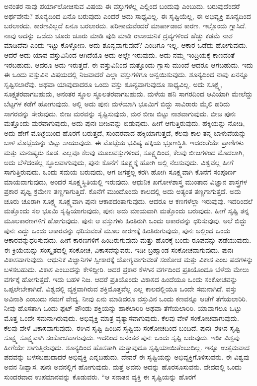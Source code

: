 ಅನಂತರ ನಾವು ಪರ್ಯಾಲೋಚಿಸುವ ವಿಷಯ ಈ ವಸ್ತುಗಳೆಲ್ಲ ಎಲ್ಲಿಂದ ಬಂದುವು ಎಂಬುದು. ಬರುವುದೆಂದರೆ ಅರ್ಥವೇನು? ಶೂನ್ಯದಿಂದ ಏನೊ ಬರುವುದು ಎಂದರೆ ಅದು ಸಾಧ್ಯವಿಲ್ಲ. ಈ ಸೃಷ್ಟಿಯೆಲ್ಲ, ಈ ಅಭಿವ್ಯಕ್ತಿ ಶೂನ್ಯದಿಂದ ಬರಲಾರದು. ಕಾರಣವಿಲ್ಲದೆ ಏನೂ ಬರಲಾರದು. ಪರಿಣಾಮವೆಂದರೆ ಮಾರ್ಪಾಡಾದ ಕಾರಣ. ಇಲ್ಲೊಂದು ಗ್ಲಾಸಿದೆ. ನಾವು ಅದನ್ನು ಒಡೆದು ಚೂರು ಚೂರು ಮಾಡಿ ಪುಡಿ ಮಾಡಿ ರಾಸಾಯನಿಕ ದ್ರವ್ಯಗಳಿಂದ ಹೆಚ್ಚು ಕಡಮೆ ನಾಶ ಮಾಡಿದೆವು ಎಂದು ಇಟ್ಟು ಕೊಳ್ಳೋಣ. ಅದು ಶೂನ್ಯವಾಗುವುದೆ? ಎಂದಿಗೂ ಇಲ್ಲ. ಆಕಾರ ಒಡೆದು ಹೋಗುವುದು. ಆದರೆ ಅದು ಯಾವ ವಸ್ತುವಿನಿಂದ ಆಗಿದೆಯೊ ಅದು ಅಲ್ಲೇ ಇರುವುದು. ಅದು ನಮ್ಮ ಇಂದ್ರಿಯಕ್ಕೆ ಕಾಣದಂತೆ ಇರಬಹುದು. ಆದರೂ ಅದು ಇರುತ್ತದೆ. ಈ ವಸ್ತುವಿನಿಂದ ಮತ್ತೊಂದು ಗ್ಲಾಸು ಮುಂದೆ ಆದರೂ ಆಗಬಹುದು. ಇದು ಈ ಒಂದು ವಸ್ತುವಿನ ವಿಷಯದಲ್ಲಿ ನಿಜವಾದರೆ ಎಲ್ಲಾ ವಸ್ತುಗಳಿಗೂ ಅನ್ವಯಿಸುವುದು. ಶೂನ್ಯದಿಂದ ನಾವು ಏನನ್ನೂ ಸೃಷ್ಟಿಸಲಾರೆವು. ಅಥವಾ ಯಾವುದಾದರೂ ಒಂದು ವಸ್ತು ಶೂನ್ಯವಾಗುವುದೂ ಸಾಧ್ಯವಿಲ್ಲ. ಅದು ಸೂಕ್ಷ್ಮ, ಸೂಕ್ಷ್ಮತರವಾಗಬಹುದು, ಅನಂತರ ಸ್ಥೂಲ ಸ್ಥೂಲತರವಾಗಬಹುದು. ಮಳೆಯ ಹನಿ ಸಾಗರದಿಂದ ಆವಿಯಾಗಿ ಮೇಲೆದ್ದು ಬೆಟ್ಟಗಳ ಕಡೆಗೆ ಹೋಗುವುದು. ಅಲ್ಲಿ ಅದು ಪುನಃ ಮಳೆಯಾಗಿ ಭೂಮಿಗೆ ಬಿದ್ದು ಸಾವಿರಾರು ಮೈಲಿ ಹರಿದು ಸಾಗರವನ್ನು ಸೇರುವುದು. ಬೀಜ ಮರವನ್ನು ಸೃಷ್ಟಿಸುವುದು, ಮರ ಬೀಜ ಬಿಟ್ಟು ನಾಶವಾಗುವುದು. ಬೀಜ ಪುನಃ ಮತ್ತೊಂದು ಮರವಾಗುವುದು, ಅದು ಪುನಃ ಬೀಜವನ್ನು ಬಿಡುವುದು. ಹೀಗೆ ಆಗುತ್ತಿರುವುದು. ಹಕ್ಕಿಯನ್ನು ನೋಡಿ, ಅದು ಹೇಗೆ ಮೊಟ್ಟೆಯಿಂದ ಹೊರಗೆ ಬರುತ್ತದೆ, ಸುಂದರವಾದ ಹಕ್ಕಿಯಾಗುತ್ತದೆ, ಕೆಲವು ಕಾಲ ತನ್ನ ಬಾಳುವೆಯನ್ನು ಬಾಳಿ ಮೊಟ್ಟೆಯನ್ನು ಬಿಟ್ಟು ಸಾಯುವುದು. ಈ ಮೊಟ್ಟೆಯ ಭವಿಷ್ಯ ಹಕ್ಕಿಯ ಭ್ರೂಣಸ್ಥಿತಿ. ಇದರಂತೆಯೇ ಪ್ರಾಣಿಗಳು ಮತ್ತು ಮನುಷ್ಯರು ಕೂಡ. ಎಲ್ಲವೂ ಕೆಲವು ಮೂಲವಸ್ತುಗಳಿಂದ, ಸೂಕ್ಷ್ಮದಿಂದ, ಕೆಲವು ಬೀಜಗಳಿಂದ ಮೊದಲಾಗಿ, ಅದು ಬೆಳೆದಂತೆಲ್ಲ ಸ್ಥೂಲವಾಗುವುದು, ಪುನಃ ಕೊನೆಗೆ ಸೂಕ್ಷ್ಮಕ್ಕೆ ಹೋಗಿ ಅಲ್ಲಿ ನೆಲಸುವುದು. ವಿಶ್ವವೆಲ್ಲ ಹೀಗೆ ಸಾಗುತ್ತಿರುವುದು. ಒಂದು ಸಮಯ ಬರುವುದು, ಆಗ ಜಗತ್ತೆಲ್ಲ ಕರಗಿ ಹೋಗಿ ಸೂಕ್ಷ್ಮವಾಗಿ ಕೊನೆಗೆ ಸಂಪೂರ್ಣ ಮಾಯವಾಗುವುದು, ಅಂದರೆ ಸೂಕ್ಷ್ಮಸ್ಥಿತಿಯಲ್ಲಿ ಇರುವುದು. ಆಧುನಿಕ ಖಗೋಳಶಾಸ್ತ್ರ ಮುಂತಾದ ವಿಜ್ಞಾನ ಶಾಸ್ತ್ರಗಳ ಪ್ರಕಾರ ಪೃಥ್ವಿ ಕ್ರಮೇಣ ತಣ್ಣಗಾಗುತ್ತಿದೆ. ಕೊನೆಗೆ ಮುಂದೊಂದು ಕಾಲದಲ್ಲಿ ಅದು ಅತ್ಯಂತ ತಣ್ಣಗಾಗುತ್ತದೆ. ಅದು ಚೂರು ಚೂರಾಗಿ ಸೂಕ್ಷ್ಮ ಸೂಕ್ಷ್ಮವಾಗಿ ಪುನಃ ಆಕಾಶದಂತಾಗುವುದು. ಆದರೂ ಆ ಕಣಗಳೆಲ್ಲಾ ಇರುವುವು. ಇದರಿಂದಲೆ ಮತ್ತೊಂದು ಸಲ ಭೂಮಿ ಸೃಷ್ಟಿಯಾಗುವುದು, ಪುನಃ ಅದು ಮಾಯವಾಗಿ ಮತ್ತೊಂದು ಬರುವುದು. ಹೀಗೆ ಸೃಷ್ಟಿ ತನ್ನ ಮೂಲಕಾರಣಗಳಿಗೆ ಹೋಗುವುದು. ಪುನಃ ಆ ವಸ್ತುಗಳು ಹಿಂತಿರುಗಿ ಒಂದು ಆಕಾರವನ್ನು ಧರಿಸುವುವು. ಅಲೆ ಬಿದ್ದು ಪುನಃ ಎದ್ದು ಒಂದು ಆಕಾರವನ್ನು ಧರಿಸುವಂತೆ ಮೂಲ ಕಾರಣಕ್ಕೆ ಹಿಂತಿರುಗುವುದು, ಪುನಃ ಅಲ್ಲಿಂದ ಒಂದು ಆಕಾರವನ್ನು\break ಧರಿಸುವುದು. ಹೀಗೆ ಕಾರಣಗಳಿಗೆ ಹಿಂದಿರುಗುವುದು ಮತ್ತು ಹೊರಕ್ಕೆ ಬಂದು ರೂಪವನ್ನು ಪಡೆಯುವುದು. ಈ ಕ್ರಿಯೆಯನ್ನು ಸಂಸ್ಕೃತದಲ್ಲಿ ಸಂಕೋಚ, ವಿಕಾಸವೆನ್ನುವರು. ಇಡೀ ಬ್ರಹ್ಮಾಂಡ ಸಂಕೋಚವಾಗುವುದು. ಪುನಃ ವಿಕಾಸವಾಗುವುದು. ಆಧುನಿಕ ವಿಜ್ಞಾನಿಗಳ ಸ್ವೀಕಾರಕ್ಕೆ ಯೋಗ್ಯವಾಗುವಂತೆ ಸಂಕೋಚ ಮತ್ತು ವಿಕಾಸ ಎಂಬ ಪದಗಳನ್ನು ಬಳಸಬಹುದು. ವಿಕಾಸ ಎಂಬುದನ್ನು ಕೇಳಿದ್ದೀರಿ. ಅದರ ಪ್ರಕಾರ ಕೆಳಗಿನ ವರ್ಗದಿಂದ ಪ್ರತಿಯೊಂದೂ ಬೆಳೆದು ಮೇಲು ವರ್ಗಕ್ಕೆ ಹೋಗುತ್ತದೆ. ಇದು ಬಹಳ ನಿಜ. ಆದರೆ ಪ್ರತಿಯೊಂದು ವಿಕಾಸದ ಹಿಂದೆಯೂ ಒಂದು ಸಂಕೋಚವನ್ನು ಒಪ್ಪಲೇಬೇಕಾಗಿದೆ. ವಿಶ್ವದಲ್ಲಿ ವ್ಯಕ್ತವಾಗಿರುವ ಶಕ್ತಿಮೊತ್ತವೆಲ್ಲ ಎಲ್ಲ ಕಾಲದಲ್ಲಿಯೂ ಒಂದೇ ಸಮನಾಗಿದೆ. ವಸ್ತು ಅವಿನಾಶಿ ಎಂಬುದು ನಮಗೆ ವೇದ್ಯ. ನೀವು ಏನು ಮಾಡಿದರೂ ವಸ್ತುವಿನ ಒಂದು ಕಣವನ್ನೂ ಆಚೆಗೆ ತೆಗೆಯಲಾರಿರಿ. ನೀವು ಹೊಸತಾಗಿ ಒಂದು ಫುಟ್ ಪೌಂಡು ಶಕ್ತಿಯನ್ನು ಹಾಕಲಾರಿರಿ ಅಥವಾ ತೆಗೆಯಲಾರಿರಿ. ಯಾವಾಗಲೂ ಒಟ್ಟು ಮೊತ್ತ ಒಂದೇ ಸಮನಾಗಿರುವುದು. ಅಭಿವ್ಯಕ್ತಿ ಮಾತ್ರ ವ್ಯತ್ಯಾಸವಾಗುವುದು. ಕೆಲವು ವೇಳೆ ಸಂಕೋಚವಾಗುವುದು. ಕೆಲವು ವೇಳೆ ವಿಕಾಸವಾಗುವುದು. ಈಗಿನ ಸೃಷ್ಟಿ ಹಿಂದಿನ ಸೃಷ್ಟಿಯ ಸಂಕೋಚದಿಂದ ಬಂದಿದೆ. ಪುನಃ ಈಗಿನ ಸೃಷ್ಟಿ ಸೂಕ್ಷ್ಮ ಸೂಕ್ಷ್ಮವಾಗಿ ಸಂಕೋಚವಾಗುವುದು. ಇದರಿಂದ ಅನಂತರ ಪುನಃ ಒಂದು ಸೃಷ್ಟಿ ಬರುವುದು. ಇಡೀ ವಿಶ್ವವು ಹೀಗೆಯೇ ಸಾಗುತ್ತಿರುವುದು. ಶೂನ್ಯದಿಂದ ಹೊಸತಾಗಿ ಮತ್ತಾವುದೂ ಸೃಷ್ಟಿಯಾಯಿತೆಂಬುದಿಲ್ಲ. ಇನ್ನೂ ಉತ್ತಮವಾದ ಪದವನ್ನು ಬಳಸಬಹುದಾದರೆ ಅಭಿವ್ಯಕ್ತಿ ಎನ್ನಬಹುದು. ದೇವರೆ ಈ ಸೃಷ್ಟಿಯನ್ನು ಅಭಿವ್ಯಕ್ತಿಗೊಳಿಸುವನು. ಈ ವಿಶ್ವವು ಅವನ ನಿಃಶ್ವಾಸ. ಪುನಃ ಅವನಲ್ಲಿಗೆ ಹೋಗುವುದು. ಮತ್ತೆ ಅವನು ಅದನ್ನು ಹೊರಸೂಸುವನು. ವೇದದಲ್ಲಿ ಒಂದು ಸುಂದರವಾದ ಉಪಮಾನವನ್ನು ಕೊಡುವರು. ``ಆ ಸನಾತನ ವ್ಯಕ್ತಿ ಈ ಸೃಷ್ಟಿಯನ್ನು ಹೊರಗೆ 